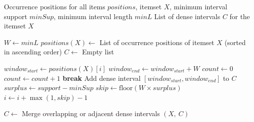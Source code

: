 \begin{algorithm}[t] 
    \caption{Sliding Window Mechanism} 
    \label{alg/sliding_window_mechanism}

    \makeatletter 
    \renewcommand{\algorithmicrequire}{\textbf{Input:}} 
    \renewcommand{\algorithmicensure}{\textbf{Output:}} 
    \makeatother
    
    \begin{algorithmic}[1] 
        \Require Occurrence positions for all items $positions$, itemset $X$, minimum interval support $minSup$, minimum interval length $minL$ 
        \Ensure List of dense intervals $C$ for the itemset $X$
    
        \State $W \gets minL$ 
        \State $positions(X) \gets$ List of occurrence positions of itemset $X$ (sorted in ascending order)
        \State $C \gets$ Empty list 
        
            \State $window_{start} \gets positions(X)[i]$ 
            \State $window_{end} \gets window_{start} + W$ 
            \State $count \gets 0$ 
                    \State $count \gets count + 1$ 
                \Else 
                    \State \textbf{break} 
                \EndIf 
            \EndFor 
                \State Add dense interval $[window_{start}, window_{end}]$ to $C$
                \State $surplus \gets support - minSup$ 
                \State $skip \gets \text{floor}(W \times surplus)$ 
                \State $i \gets i + \max(1, skip) - 1$ 
            \EndIf
        \EndFor
        
        \State $C \gets$ Merge overlapping or adjacent dense intervals 
        \State \Return $(X,~C)$
        
    \end{algorithmic} 
\end{algorithm}
